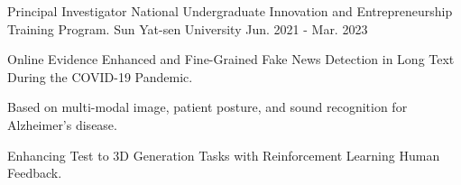 

\begin{cventries}

  \cventry
    {Principal Investigator} %
    {National Undergraduate Innovation and Entrepreneurship Training Program.} %
    {Sun Yat-sen University} %
    {Jun. 2021 - Mar. 2023} %
    {
      \begin{cvitems} %
        \item {Online Evidence Enhanced and Fine-Grained Fake News Detection in Long Text During the COVID-19 Pandemic.}
        \item {Based on multi-modal image, patient posture, and sound recognition for Alzheimer's disease.}
        \item {Enhancing Test to 3D Generation Tasks with Reinforcement Learning Human Feedback.}
      \end{cvitems}
    }

\end{cventries}
